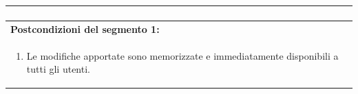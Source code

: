 \documentclass{article}
\begin{document}
\begin{table}[H]
\begin{tabular}{|p{\linewidth}|}
\begin{enumerate}
                        \end{enumerate} \\
                        \hline
                        \cellcolor{gray!20}
                        \textbf{Postcondizioni del segmento 1:} \\
                        \cellcolor{gray!20}
                        \begin{minipage}{\linewidth}
                            \begin{enumerate}
                                \item Le modifiche apportate sono memorizzate e immediatamente disponibili a tutti gli utenti.
                            \end{enumerate}
                        \end{minipage} \\
                        \hline
                    \end{tabular}
                \end{table}
\end{document}
